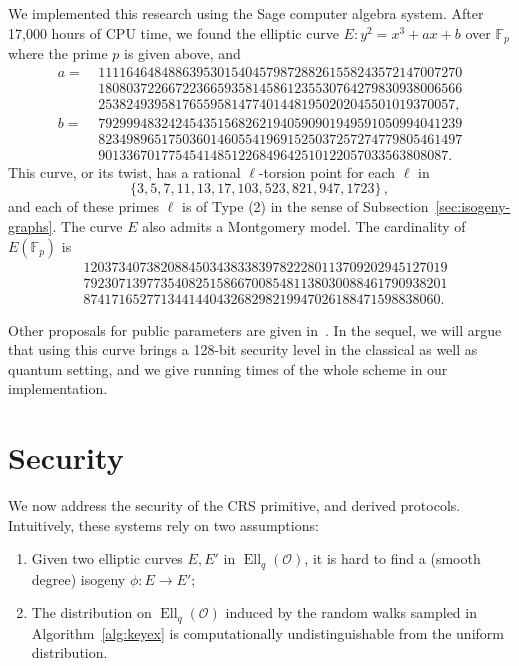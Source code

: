\documentclass{article}
\newcommand{\F}{\mathbb{F}}
\renewcommand{\O}{\mathcal{O}}
\theoremstyle{definition}
\DeclareMathOperator{\Ell}{Ell}
\begin{document}
We implemented this research using the Sage computer algebra system.
After 17,000 hours of CPU time, we found the elliptic curve
$
	E : y^2 = x^3 + ax + b
$
over $\F_p$ where the prime $p$ is given above, and
\[
\begin{aligned}
a =\ & 1111646484886395301540457987288261558243572147007270 \\ 
& 1808037226672236659358145861235530764279830938006566 \\
& 253824939581765595814774014481950202045501019370057,\\
b =\ & 7929994832424543515682621940590901949591050994041239 \\
& 8234989651750360146055419691525037257274779805461497 \\ 
& 90133670177545414851226849642510122057033563808087.
\end{aligned}
\]
This curve, or its twist, has a rational $\ell$-torsion point 
for each $\ell$ in
\[
  \{3, 5, 7, 11, 13, 17, 103, 523, 821, 947, 1723\}
  \,,
\]
and each of these primes $\ell$ is of Type (2)
in the sense of Subsection~\ref{sec:isogeny-graphs}.
The curve $E$ also admits a Montgomery model.
The cardinality of $E(\F_p)$ is
\[
\begin{aligned}
& 1203734073820884503438338397822280113709202945127019 \\ 
& 7923071397735408251586670085481138030088461790938201 \\
& 874171652771344144043268298219947026188471598838060.
\end{aligned}
\]

Other proposals for public parameters are given in~\cite{todo:memoire}.
In the sequel, we will argue that using this curve brings a 128-bit security level
in the classical as well as quantum setting, and we give running times of the whole
scheme in our implementation.

\section{Security}
\label{sec:sec}

We now address the security of the CRS primitive, and derived
protocols. Intuitively, these systems rely on two assumptions:
\begin{enumerate}
\item Given two elliptic curves $E,E'$ in $\Ell_q(\O)$, it is hard to
  find a (smooth degree) isogeny $ϕ:E→E'$;
\item The distribution on $\Ell_q(\O)$ induced by the random walks
  sampled in Algorithm~\ref{alg:keyex} is computationally
  undistinguishable from the uniform distribution.
\end{enumerate}
\end{document}
